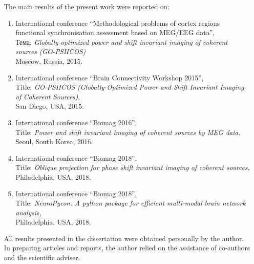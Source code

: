 The main results of the present work were reported on:
\begin{enumerate}
    \item International conference ``Methodological problems of cortex regions functional synchronisation assessment based on MEG/EEG data'',\\
      Тема: \emph{Globally-optimized power and shift invariant imaging of coherent sources (GO-PSIICOS)}\\
      Moscow, Russia, 2015.
    \item International conference ``Brain Connectivity Workshop 2015'', \\
        Title: \emph{GO-PSIICOS (Globally-Optimized Power and Shift Invariant Imaging of Coherent Sources)},\\
        San Diego, USA, 2015.
    \item International conference ``Biomag 2016'', \\
        Title: \emph{Power and shift invariant imaging of coherent sources by MEG data},\\
        Seoul, South Korea, 2016.
    \item International conference ``Biomag 2018'', \\
        Title: \emph{Oblique projection for phase shift invariant imaging of coherent sources},\\
        Philadelphia, USA, 2018.
    \item International conference ``Biomag 2018'', \\
        Title: \emph{NeuroPycon: A python package for efficient multi-modal brain network analysis},\\
        Philadelphia, USA, 2018.
\end{enumerate}



{\contribution}
All results presented in the dissertation were obtained personally by the
author. In preparing articles and reports, the author relied on the assistance
of co-authors and the scientific adviser.


